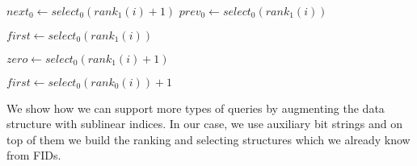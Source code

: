 \begin{algorithmic}
	\State {}
\EndFunction
\end{algorithmic}

\begin{algorithmic}
	\State {} 
\EndFunction
\end{algorithmic}

\begin{algorithmic}
		\State {}
	\Else
		\State {} 
	\EndIf
\EndFunction
\end{algorithmic}

\begin{algorithmic}
	\State $next_0 \gets select_0(rank_1(i) + 1)$ 
	\State $prev_0 \gets select_0(rank_1(i))$ 
	\State {}
\EndFunction
\end{algorithmic}

\begin{algorithmic}
		\State {}
		\State {}
	\Else
		\State $first \gets select_0(rank_1(i))$ 
		\State {}
	\EndIf
\EndFunction
\end{algorithmic}

\begin{algorithmic}
 
		\State {}
	\Else
		\State $zero \gets select_0(rank_1(i) + 1)$ 
		\State {}
	\EndIf
\EndFunction
\end{algorithmic}

\begin{algorithmic}
		\State {}
	\Else
		\State $first \gets select_0(rank_0(i)) + 1$ 
		\State {}
	\EndIf
\EndFunction
\end{algorithmic}

\bigskip

We show how we can support more types of queries by augmenting the data structure with sublinear indices.
In our case, we use auxiliary bit strings and on top of them we build the ranking and selecting structures which we already know from FIDs.

